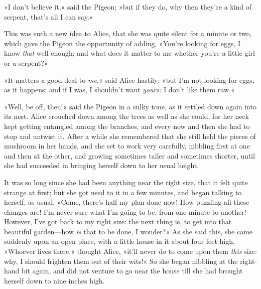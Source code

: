 »I don't believe it,« said the Pigeon; »but if they do, why then they're a kind of serpent, that's all I can say.«

This was such a new idea to Alice, that she was quite silent for a minute or two, which gave the Pigeon the opportunity of adding, »You're looking for eggs, I know \textit{that} well enough; and what does it matter to me whether you're a little girl or a serpent?«

»It matters a good deal to \textit{me},« said Alice hastily; »but I'm not looking for eggs, as it happens; and if I was, I shouldn't want \textit{yours:} I don't like them raw.«

»Well, be off, then!« said the Pigeon in a sulky tone, as it settled down again into its nest. Alice crouched down among the trees as well as she could, for her neck kept getting entangled among the branches, and every now and then she had to stop and untwist it. After a while she remembered that she still held the pieces of mushroom in her hands, and she set to work very carefully, nibbling first at one and then at the other, and growing sometimes taller and sometimes shorter, until she had succeeded in bringing herself down to her usual height.

It was so long since she had been anything near the right size, that it felt quite strange at first; but she got used to it in a few minutes, and began talking to herself, as usual. »Come, there's half my plan done now! How puzzling all these changes are! I'm never sure what I'm going to be, from one minute to another! However, I've got back to my right size: the next thing is, to get into that beautiful garden—how \textit{is} that to be done, I wonder?« As she said this, she came suddenly upon an open place, with a little house in it about four feet high. »Whoever lives there,« thought Alice, »it'll never do to come upon them \textit{this} size: why, I should frighten them out of their wits!« So she began nibbling at the right-hand bit again, and did not venture to go near the house till she had brought herself down to nine inches high.

